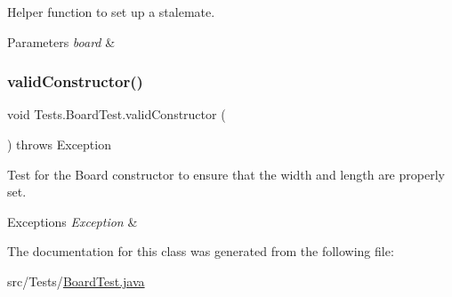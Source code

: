 Helper function to set up a stalemate. 
\begin{DoxyParams}{Parameters}
{\em board} & \\
\hline
\end{DoxyParams}
\hypertarget{class_tests_1_1_board_test_a7a85d67a559913d4e5a3b0977daa5309}{}\label{class_tests_1_1_board_test_a7a85d67a559913d4e5a3b0977daa5309} 
\subsubsection{\texorpdfstring{valid\+Constructor()}{validConstructor()}}
{\footnotesize\ttfamily void Tests.\+Board\+Test.\+valid\+Constructor (\begin{DoxyParamCaption}{ }\end{DoxyParamCaption}) throws Exception}

Test for the Board constructor to ensure that the width and length are properly set. 
\begin{DoxyExceptions}{Exceptions}
{\em Exception} & \\
\hline
\end{DoxyExceptions}


The documentation for this class was generated from the following file\+:\begin{DoxyCompactItemize}
\item 
src/\+Tests/\hyperlink{_board_test_8java}{Board\+Test.\+java}\end{DoxyCompactItemize}
